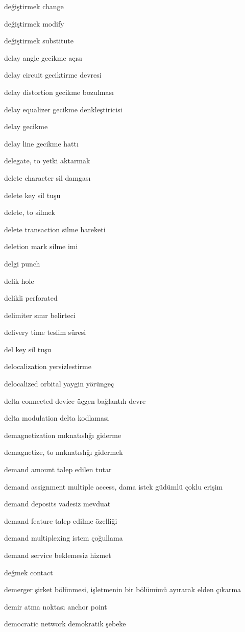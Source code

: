 \documentclass[12pt,fleqn]{article}\usepackage{../../common}
\begin{document}
değiştirmek change

değiştirmek modify

değiştirmek substitute

delay angle gecikme açısı

delay circuit geciktirme devresi

delay distortion gecikme bozulması

delay equalizer gecikme denkleştiricisi

delay gecikme

delay line gecikme hattı

delegate, to yetki aktarmak

delete character sil damgası

delete key sil tuşu

delete, to silmek

delete transaction silme hareketi

deletion mark silme imi

delgi punch

delik hole

delikli perforated

delimiter sınır belirteci

delivery time teslim süresi

del key sil tuşu

delocalization yersizlestirme

delocalized orbital yaygin yörüngeç

delta connected device üçgen bağlantılı devre

delta modulation delta kodlaması

demagnetization mıknatıslığı giderme

demagnetize, to mıknatıslığı gidermek

demand amount talep edilen tutar

demand assignment multiple access, dama istek güdümlü çoklu erişim

demand deposits vadesiz mevduat

demand feature talep edilme özelliği

demand multiplexing istem çoğullama

demand service beklemesiz hizmet

değmek contact

demerger şirket bölünmesi, işletmenin bir bölümünü ayırarak elden çıkarma

demir atma noktası anchor point

democratic network demokratik şebeke
\end{document}
